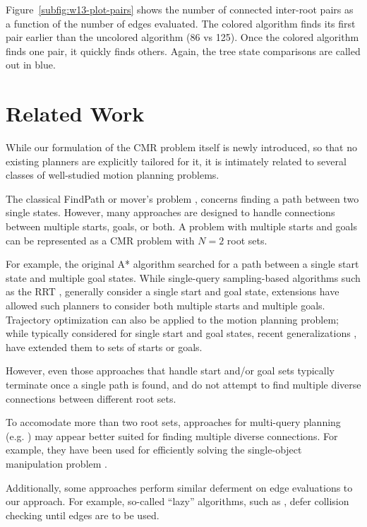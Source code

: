 \documentclass{report}
\begin{document}
Figure~\ref{subfig:w13-plot-pairs} shows the number of connected inter-root
pairs as a function of the number of edges evaluated.
The colored algorithm finds its first pair earlier than the uncolored
algorithm (86 vs 125).
Once the colored algorithm finds one pair,
it quickly finds others.
Again, the tree state comparisons are called out in blue.

\section{Related Work}
\label{sec:related}

While our formulation of the CMR problem itself is newly introduced,
so that no existing planners are explicitly tailored for it,
it is intimately related to several classes of well-studied
motion planning problems.

The classical FindPath or mover's problem
\cite{choset2005robotmotion}, \cite{lavalle2006planningbook}
concerns finding a path between two single states.
However,
many approaches are designed to handle connections
between multiple starts, goals, or both.
A problem with multiple starts and goals can be represented as a CMR problem
with $N=2$ root sets.

For example, the original A* algorithm \cite{hart1968astar}
searched for a path between a single start state
and multiple goal states.
While single-query sampling-based algorithms such as the RRT
\cite{lavallekuffner1999rrt}, \cite{kuffner2000rrtconnect}
generally consider a single start and goal state,
extensions \cite{berenson2009manifolds}
have allowed such planners to consider both multiple starts and multiple
goals.
Trajectory optimization can also be applied to the motion planning problem;
while typically considered for single start and goal states,
recent generalizations \cite{dragan2011goalsets}, \cite{schulman2013trajopt}
have extended them to sets of starts or goals.

However, even those approaches that handle start and/or goal sets
typically terminate once a single path is found,
and do not attempt to find multiple diverse connections
between different root sets.

To accomodate more than two root sets,
approaches for multi-query planning
(e.g. \cite{kavrakietal1996prm}) may appear better suited for finding
multiple diverse connections.
For example, they have been used for efficiently solving the single-object
manipulation problem \cite{simeon2004manipulation}.

Additionally, some approaches perform similar deferment on edge
evaluations to our approach.
For example, so-called ``lazy'' algorithms,
such as \cite{bohlin2000lazyprm}, \cite{sanchezante2001sbl}
defer collision checking until edges are to be used.
\end{document}
